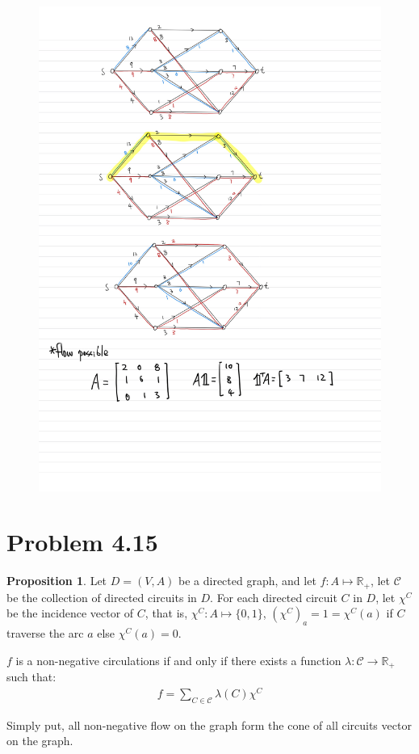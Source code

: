 \documentclass[]{article}
\theoremstyle{definition}
\newtheorem{prop}{Proposition}[section]  %
\begin{document}
        \begin{figure}
            \centering
            \includegraphics[width=14cm]{Settled Results Ready to Transfer-7.jpg}
        \end{figure}
    \newpage

\section{Problem 4.15}
    \begin{prop}
        Let $D = (V, A)$ be a directed graph, and let $f:A\mapsto \mathbb R_+$, let $\mathcal C$ be the collection of directed circuits in $D$. For each directed circuit $C$ in $D$, let $\chi^C$ be the incidence vector of $C$, that is, $\chi^C: A\mapsto \{0, 1\}$, $(\chi^C)_a=1=\chi^C(a)$ if $C$ traverse the arc $a$ else $\chi^C(a) = 0$. 
        \par
        $f$ is a non-negative circulations if and only if there exists a function $\lambda: \mathcal C \rightarrow \mathbb R_+$ such that: 
        \begin{align}
            f = \sum_{C\in \mathcal C}^{}\lambda(C)\chi^C
        \end{align}
        \par
        Simply put, all non-negative flow on the graph form the cone of all circuits vector on the graph. 
    \end{prop}
\end{document}
